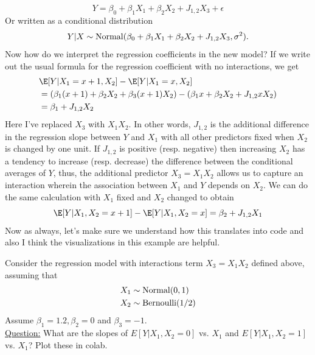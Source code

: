 \begin{equation*}
Y = \beta_0 + \beta_1 X_1 + \beta_2 X_2 + J_{1,2}X_3 + \epsilon
\end{equation*} 
Or written as a conditional distribution 
\begin{equation*}
Y|X \sim {\rm Normal}( \beta_0 + \beta_1 X_1 + \beta_2 X_2 + J_{1,2} X_3, \sigma^2). 
\end{equation*} 
 Now how do we interpret the regression coefficients in the new model? 
If we write out the usual formula for the regression coefficient with no interactions, we get 
\begin{align*}
 &\E[Y|X_1 = x+1,X_2] -\E[Y|X_1 = x,X_2]\\
 &  =  \left(\beta_1 (x+1)+ \beta_2 X_2 + \beta_3 (x+1)X_2\right)- \left(\beta_1 x + \beta_2 X_2 + J_{1,2} x X_2\right)\\
 &= \beta_1 + J_{1,2}X_2
\end{align*}
Here I've replaced $X_3$ with $X_1X_2$. In other words, $J_{1,2}$ is the additional difference in the regression slope between $Y$ and $X_1$ with all other predictors fixed when $X_2$ is changed by one unit. 
If $J_{1,2}$ is positive (resp. negative) then increasing $X_2$ has a tendency to increase (resp. decrease) the difference between the conditional averages of $Y$, thus, the additional predictor $X_3 = X_1X_2$ allows us to capture an interaction wherein the association between $X_1$ and $Y$ depends on $X_2$. We can do the same calculation with $X_1$ fixed and $X_2$ changed to obtain 
\begin{equation*}
 \E[Y|X_1,X_2 = x+1] - \E[Y|X_1,X_2 = x] = \beta_2 + J_{1,2}X_1
\end{equation*}
Now as always, let's make sure we understand how this translates into code and also I think the visualizations in this example are helpful. 


\begin{example}
Consider the regression model with interactions term $X_3 = X_1X_2$ defined above, assuming that 
\begin{align*}
X_1 &\sim {\rm Normal}(0,1)\\
X_2 &\sim {\rm Bernoulli}(1/2)
\end{align*}
Assume $\beta_1 = 1.2,\beta_2 = 0$ and $\beta_3 =-1$. \\


\noindent
\underline{Question:} What are the slopes of $E[Y|X_1,X_2=0]$ vs. $X_1$ and $E[Y|X_1,X_2=1]$ vs. $X_1$? Plot these in colab. 


\end{example}

